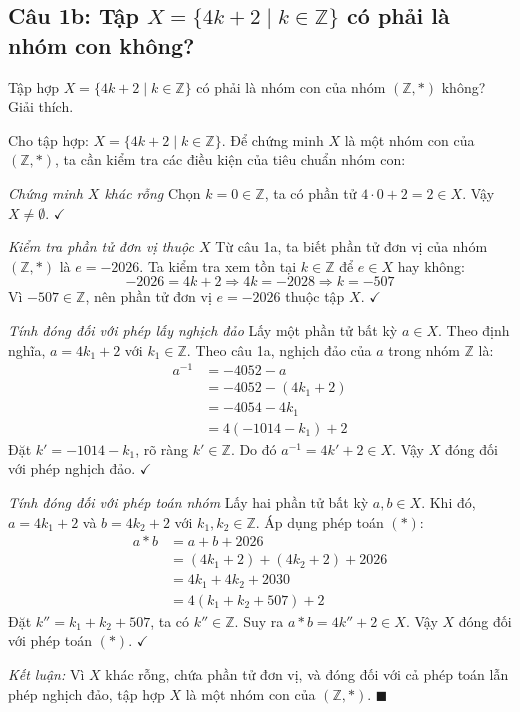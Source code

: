 \subsection*{Câu 1b: Tập $X = \{4k+2 \mid k \in \mathbb{Z}\}$ có phải là nhóm con không?}

\begin{questionbox}
Tập hợp $X = \{4k + 2 \mid k \in \mathbb{Z}\}$ có phải là nhóm con của nhóm $(\mathbb{Z}, *)$ không? Giải thích.
\end{questionbox}

\begin{solution}
Cho tập hợp: $X = \{4k + 2 \mid k \in \mathbb{Z}\}$.
Để chứng minh $X$ là một nhóm con của $(\mathbb{Z}, *)$, ta cần kiểm tra các điều kiện của tiêu chuẩn nhóm con:

\textit{Chứng minh $X$ khác rỗng}
Chọn $k = 0 \in \mathbb{Z}$, ta có phần tử $4 \cdot 0 + 2 = 2 \in X$.
Vậy $X \neq \emptyset$. $\checkmark$

\textit{Kiểm tra phần tử đơn vị thuộc $X$}
Từ câu 1a, ta biết phần tử đơn vị của nhóm $(\mathbb{Z}, *)$ là $e = -2026$.
Ta kiểm tra xem tồn tại $k \in \mathbb{Z}$ để $e \in X$ hay không:
\[
    -2026 = 4k + 2 \Rightarrow 4k = -2028 \Rightarrow k = -507
\]
Vì $-507 \in \mathbb{Z}$, nên phần tử đơn vị $e = -2026$ thuộc tập $X$. $\checkmark$

\textit{Tính đóng đối với phép lấy nghịch đảo}
Lấy một phần tử bất kỳ $a \in X$. Theo định nghĩa, $a = 4k_1 + 2$ với $k_1 \in \mathbb{Z}$.
Theo câu 1a, nghịch đảo của $a$ trong nhóm $\mathbb{Z}$ là:
\begin{align*}
    a^{-1} &= -4052 - a \\
    &= -4052 - (4k_1 + 2) \\
    &= -4054 - 4k_1 \\
    &= 4(-1014 - k_1) + 2
\end{align*}
Đặt $k' = -1014 - k_1$, rõ ràng $k' \in \mathbb{Z}$. Do đó $a^{-1} = 4k' + 2 \in X$.
Vậy $X$ đóng đối với phép nghịch đảo. $\checkmark$

\textit{Tính đóng đối với phép toán nhóm}
Lấy hai phần tử bất kỳ $a, b \in X$. Khi đó, $a = 4k_1 + 2$ và $b = 4k_2 + 2$ với $k_1, k_2 \in \mathbb{Z}$.
Áp dụng phép toán $(*)$:
\begin{align*}
    a * b &= a + b + 2026 \\
    &= (4k_1 + 2) + (4k_2 + 2) + 2026 \\
    &= 4k_1 + 4k_2 + 2030 \\
    &= 4(k_1 + k_2 + 507) + 2
\end{align*}
Đặt $k'' = k_1 + k_2 + 507$, ta có $k'' \in \mathbb{Z}$. Suy ra $a * b = 4k'' + 2 \in X$.
Vậy $X$ đóng đối với phép toán $(*)$. $\checkmark$

\textit{Kết luận:} Vì $X$ khác rỗng, chứa phần tử đơn vị, và đóng đối với cả phép toán lẫn phép nghịch đảo, tập hợp $X$ là một nhóm con của $(\mathbb{Z}, *)$. $\blacksquare$
\end{solution}

